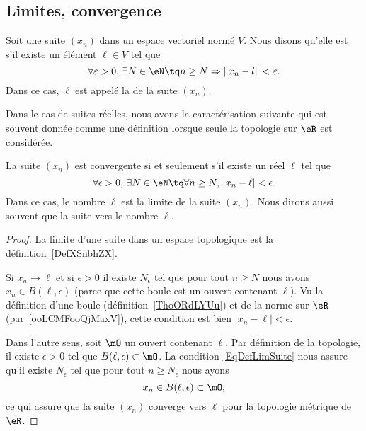 \subsection{Limites, convergence}

\begin{definition}		\label{DefCvSuiteEGVN}
	Soit une suite $(x_n)$ dans un espace vectoriel normé $V$. Nous disons qu'elle est
     s'il existe un élément $\ell\in V$ tel que
	\begin{equation}
		\forall \varepsilon>0,\,\exists N\in\eN\tq n\geq N\Rightarrow \| x_n-l \|<\varepsilon.
	\end{equation}
	Dans ce cas, $\ell$ est appelé la  de la suite $(x_n)$.
\end{definition}

Dans le cas de suites réelles, nous avons la caractérisation suivante qui est souvent donnée comme une définition lorsque seule la topologie sur \( \eR\) est considérée.
\begin{proposition}	\label{PropLimiteSuiteNum}
	La suite $(x_n)$ est convergente si et seulement s'il existe un réel $\ell$ tel que
	\begin{equation}		\label{EqDefLimSuite}
		\forall \epsilon>0,\,\exists N\in\eN\tq\forall n\geq N,\,| x_n-\ell |<\epsilon.
	\end{equation}
	Dans ce cas, le nombre $\ell$ est la limite de la suite $(x_n)$. Nous dirons aussi souvent que la suite  vers le nombre $\ell$.
\end{proposition}

\begin{proof}
    La limite d'une suite dans un espace topologique est la définition~\ref{DefXSnbhZX}.

    Si \( x_n\to \ell\) et si \( \epsilon>0\) il existe \( N_{\epsilon}\) tel que pour tout \( n\geq N\) nous avons \( x_n\in B(\ell,\epsilon)\) (parce que cette boule est un ouvert contenant \( \ell\)). Vu la définition d'une boule (définition~\ref{ThoORdLYUu}) et de la norme sur \( \eR\) (par~\ref{ooLCMFooQjMaxV}), cette condition est bien \( | x_n-\ell |<\epsilon\).

    Dans l'autre sens, soit \( \mO\) un ouvert contenant \( \ell\). Par définition de la topologie, il existe \( \epsilon>0\) tel que \( B(\ell,\epsilon)\subset \mO\). La condition \eqref{EqDefLimSuite} nous assure qu'il existe \( N_{\epsilon} \) tel que pour tout \( n\geq N_{\epsilon}\) nous ayons
    \begin{equation}
        x_n\in B(\ell,\epsilon)\subset\mO,
    \end{equation}
    ce qui assure que la suite \( (x_n)\) converge vers \( \ell\) pour la topologie métrique de \( \eR\).
\end{proof}

